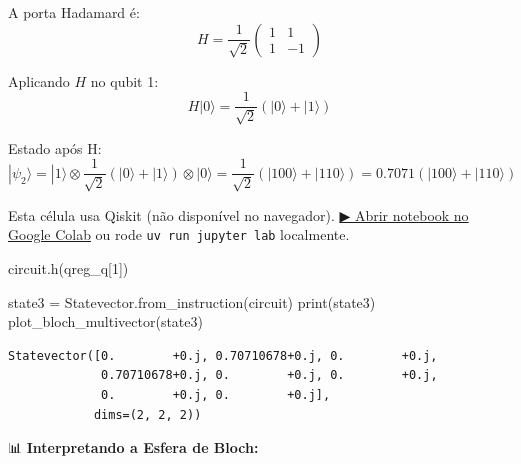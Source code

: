 \documentclass[
  brazilian,
]{report}
\newenvironment{Shaded}{\begin{snugshade}}{\end{snugshade}}
\newcommand{\BuiltInTok}[1]{\textcolor[rgb]{0.00,0.23,0.31}{#1}}
\newcommand{\DecValTok}[1]{\textcolor[rgb]{0.68,0.00,0.00}{#1}}
\newcommand{\NormalTok}[1]{\textcolor[rgb]{0.00,0.23,0.31}{#1}}
\newcommand{\OperatorTok}[1]{\textcolor[rgb]{0.37,0.37,0.37}{#1}}
\begin{document}
A porta Hadamard é:
\[H = \frac{1}{\sqrt{2}}\begin{pmatrix} 1 & 1 \\ 1 & -1 \end{pmatrix}\]

Aplicando \(H\) no qubit 1:
\[H|0\rangle = \frac{1}{\sqrt{2}}(|0\rangle + |1\rangle)\]

Estado após H:
\[|\psi_2\rangle = |1\rangle \otimes \frac{1}{\sqrt{2}}(|0\rangle + |1\rangle) \otimes |0\rangle = \frac{1}{\sqrt{2}}(|100\rangle + |110\rangle) = 0.7071 (|100\rangle + |110\rangle)\]

\begin{tcolorbox}[enhanced jigsaw, arc=.35mm, bottomrule=.15mm, bottomtitle=1mm, breakable, colback=white, colbacktitle=quarto-callout-warning-color!10!white, colframe=quarto-callout-warning-color-frame, coltitle=black, left=2mm, leftrule=.75mm, opacityback=0, opacitybacktitle=0.6, rightrule=.15mm, title=\textcolor{quarto-callout-warning-color}{\faExclamationTriangle}\hspace{0.5em}{⚛️ Célula Qiskit --- execute no Colab ou localmente}, titlerule=0mm, toprule=.15mm, toptitle=1mm]

Esta célula usa Qiskit (não disponível no navegador).
\href{https://colab.research.google.com/github/maxwellamaral/aula-quantum/blob/main/notebooks/02-teletransport.ipynb}{▶
Abrir notebook no Google Colab} ou rode \texttt{uv\ run\ jupyter\ lab}
localmente.

\begin{Shaded}
\begin{Highlighting}[]

\NormalTok{circuit.h(qreg\_q[}\DecValTok{1}\NormalTok{])}

\NormalTok{state3 }\OperatorTok{=}\NormalTok{ Statevector.from\_instruction(circuit)}
\BuiltInTok{print}\NormalTok{(state3)}
\NormalTok{plot\_bloch\_multivector(state3)}
\end{Highlighting}
\end{Shaded}

\end{tcolorbox}

\begin{verbatim}
Statevector([0.        +0.j, 0.70710678+0.j, 0.        +0.j,
             0.70710678+0.j, 0.        +0.j, 0.        +0.j,
             0.        +0.j, 0.        +0.j],
            dims=(2, 2, 2))
\end{verbatim}

📊 \textbf{Interpretando a Esfera de Bloch:}
\end{document}
